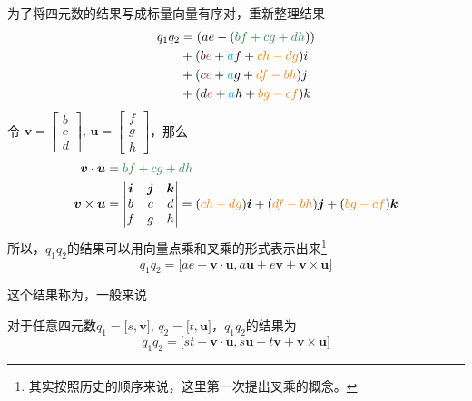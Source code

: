 \sssection[Grassmann 积]

为了将四元数的结果写成标量向量有序对，重新整理结果
\begin{align}
	q_1 q_2 & = (ae - ({\color{SeaGreen}bf + cg + dh})) \notag \\
	& + (b {\color{VioletRed} e} + {\color{cyan} a}f +{\color{orange} ch - dg} ) i \notag \\
	& + (c {\color{VioletRed} e} + {\color{cyan} a}g +{\color{orange} df - bh} ) j \notag \\
	& + (d {\color{VioletRed} e} + {\color{cyan} a}h +{\color{orange} bg - cf} ) k \notag 
\end{align}
令
$
\bm{v} = 
\begin{bmatrix}
	b \\
	c \\
	d
\end{bmatrix}
, \,
\bm{u} = 
\begin{bmatrix}
	f \\
	g \\
	h
\end{bmatrix}
$，那么
\begin{align*}
	\bm{v} \cdot \bm{u} &= {\color{SeaGreen}bf + cg + dh} \\
	\bm{v} \times \bm{u} &= 
	\begin{vmatrix}
		\bm{i} & \bm{j} & \bm{k} \\
		b & c & d \\
		f& g & h
	\end{vmatrix}
= ({\color{orange} ch - dg}) \bm{i} + ({\color{orange} df - bh} )\bm{j} + ({\color{orange} bg - cf} )\bm{k}
\end{align*}
所以，$q_1q_2$的结果可以用向量点乘和叉乘的形式表示出来\footnote[1]{其实按照历史的顺序来说，这里第一次提出叉乘的概念。}
\begin{equation}
	q_1 q_2 = \big[ ae - \bm{v} \cdot \bm{u}, a\bm{u} +e \bm{v} + \bm{v} \times \bm{u} \big]
\end{equation}

这个结果称为，一般来说

{
	对于任意四元数$q_1= \big[s, \bm{v} \big],\, q_2= \big[ t, \bm{u} \big]$，$q_1q_2$的结果为
	\begin{equation}
		q_1 q_2 = \big[ st - \bm{v} \cdot \bm{u}, s \bm{u} + t \bm{v} + \bm{v} \times \bm{u} \big]
		\label{Grassmann}
	\end{equation}
}
\vspace*{0.5em}


